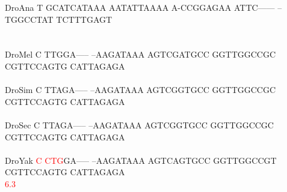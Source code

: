 \documentclass[11pt,twoside,reqno,a4paper]{article}
\begin{document}
{DroAna	T	GCATCATAAA	AATATTAAAA	A-CCGGAGAA	ATTC------	--TGGCCTAT	TCTTTGAGT\\
\hspace*{7\charwidth}\hspace*{1\charwidth}\hspace*{1\charwidth}\hspace*{1\charwidth}\hspace*{1\charwidth}\hspace*{1\charwidth}\hspace*{1\charwidth}\\
\\
DroMel	C	TTGGA-----	--AAGATAAA	AGTCGATGCC	GGTTGGCCGC	CGTTCCAGTG	CATTAGAGA\\
\hspace*{7\charwidth}\hspace*{1\charwidth}\hspace*{1\charwidth}\hspace*{1\charwidth}\hspace*{1\charwidth}\hspace*{1\charwidth}\hspace*{1\charwidth}\\
DroSim	C	TTAGA-----	--AAGATAAA	AGTCGGTGCC	GGTTGGCCGC	CGTTCCAGTG	CATTAGAGA\\
\hspace*{7\charwidth}\hspace*{1\charwidth}\hspace*{1\charwidth}\hspace*{1\charwidth}\hspace*{1\charwidth}\hspace*{1\charwidth}\hspace*{1\charwidth}\\
DroSec	C	TTAGA-----	--AAGATAAA	AGTCGGTGCC	GGTTGGCCGC	CGTTCCAGTG	CATTAGAGA\\
\hspace*{7\charwidth}\hspace*{1\charwidth}\hspace*{1\charwidth}\hspace*{1\charwidth}\hspace*{1\charwidth}\hspace*{1\charwidth}\hspace*{1\charwidth}\\
DroYak	\textcolor{Red}{C}	\textcolor{Red}{C}\textcolor{Red}{T}\textcolor{Red}{G}GA-----	--AAGATAAA	AGTCAGTGCC	GGTTGGCCGT	CGTTCCAGTG	CATTAGAGA\\
\hspace*{7\charwidth}\hspace*{0\charwidth}\textcolor{Red}{6.3}\hspace*{1\charwidth}\hspace*{1\charwidth}\hspace*{1\charwidth}\hspace*{1\charwidth}\hspace*{1\charwidth}\hspace*{1\charwidth}\\
}
\end{document}
